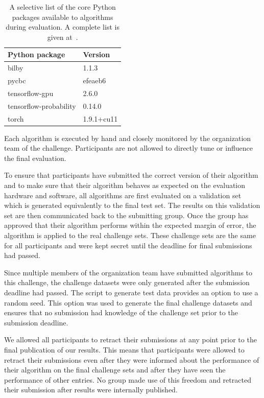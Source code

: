 \begin{table}[]
    \centering
    \begin{tabularx}{0.48\textwidth}{XX}
        \hline\hline
        Python package & Version \\
        \hline
        bilby & 1.1.3 \\
        pycbc & efeaeb6 \\
        tensorflow-gpu & 2.6.0 \\
        tensorflow-probability & 0.14.0 \\
        torch & 1.9.1+cu11 \\
        \hline\hline
    \end{tabularx}
    \caption[Core software stack]{A selective list of the core Python packages available to algorithms during evaluation. A complete list is given at~\cite{github}.}
    \label{tab:software}
\end{table}

Each algorithm is executed by hand and closely monitored by the organization team of the challenge. Participants are not allowed to directly tune or influence the final evaluation.

To ensure that participants have submitted the correct version of their algorithm and to make sure that their algorithm behaves as expected on the evaluation hardware and software, all algorithms are first evaluated on a validation set which is generated equivalently to the final test set. The results on this validation set are then communicated back to the submitting group. Once the group has approved that their algorithm performs within the expected margin of error, the algorithm is applied to the real challenge sets. These challenge sets are the same for all participants and were kept secret until the deadline for final submissions had passed.

Since multiple members of the organization team have submitted algorithms to this challenge, the challenge datasets were only generated after the submission deadline had passed. The script to generate test data provides an option to use a random seed. This option was used to generate the final challenge datasets and ensures that no submission had knowledge of the challenge set prior to the submission deadline.

We allowed all participants to retract their submissions at any point prior to the final publication of our results. This means that participants were allowed to retract their submissions even after they were informed about the performance of their algorithm on the final challenge sets and after they have seen the performance of other entries. No group made use of this freedom and retracted their submission after results were internally published.


